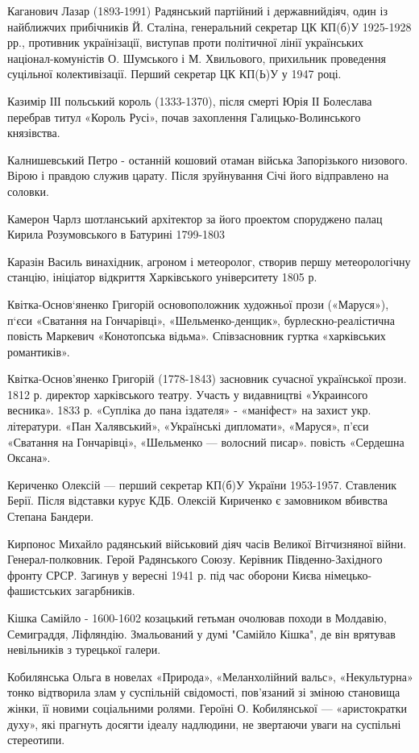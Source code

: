 Каганович Лазар (1893-1991) Радянський партійний і державнийдіяч, один із найближчих прибічників Й. Сталіна, генеральний секретар ЦК КП(б)У 1925-1928 рр., противник українізації, виступав проти політичної лінії українських націонал-комуністів О. Шумського і М. Хвильового, прихильник проведення суцільної колективізації. Перший секретар ЦК КП(Ь)У у 1947 році.

Казимір ІІІ польський король (1333-1370), після смерті Юрія ІІ Болеслава перебрав титул «Король Русі», почав захоплення Галицько-Волинського князівства.

Калнишевський  Петро - останній кошовий отаман війська Запорізького низового. Вірою і правдою служив царату. Після зруйнування Січі його відправлено на соловки.

Камерон Чарлз шотланський архітектор за його проектом споруджено  палац Кирила Розумовського в Батурині 1799-1803 

Каразін Василь винахідник, агроном і метеоролог, створив першу метеорологічну станцію, ініціатор відкриття Харківського університету 1805 р.

Квітка-Основ‘яненко Григорій основоположник художньої прози («Маруся»), п‘єси «Сватання на Гончарівці», «Шельменко-денщик», бурлескно-реалістична повість Маркевич «Конотопська відьма». Співзасновник гуртка «харківських романтиків».

Квітка-Основ’яненко Григорій (1778-1843) засновник сучасної української прози. 1812 р. директор харківського театру. Участь у видавництві «Украинсого весника». 1833 р. «Супліка до пана іздателя» - «маніфест» на захист укр. літератури. «Пан Халявський», «Українські дипломати», «Маруся», п’єси «Сватання на Гончарівці»,  «Шельменко --- волосний писар». повість «Сердешна Оксана».

Кериченко Олексій --- перший секретар КП(б)У України 1953-1957. Ставленик Берії. Після відставки курує КДБ. Олексій Кириченко є замовником вбивства Степана Бандери.

Кирпонос Михайло радянський військовий діяч часів Великої Вітчизняної війни. Генерал-полковник. Герой Радянського Союзу. Керівник Південно-Західного фронту СРСР. Загинув у вересні 1941 р. під час оборони Києва німецько-фашистських загарбників.

Кішка Самійло - 1600-1602 козацький гетьман очолював походи в Молдавію, Семиграддя, Ліфляндію. Змальований у думі "Самійло Кішка", де він врятував невільників з турецької галери.

Кобилянська Ольга  в новелах «Природа», «Меланхолійний вальс», «Некультурна» тонко відтворила злам у суспільній свідомості, пов’язаний зі зміною становища жінки, її новими соціальними ролями. Героїні О. Кобилянської --- «аристократки духу», які прагнуть досягти ідеалу надлюдини, не звертаючи уваги на суспільні стереотипи. 

